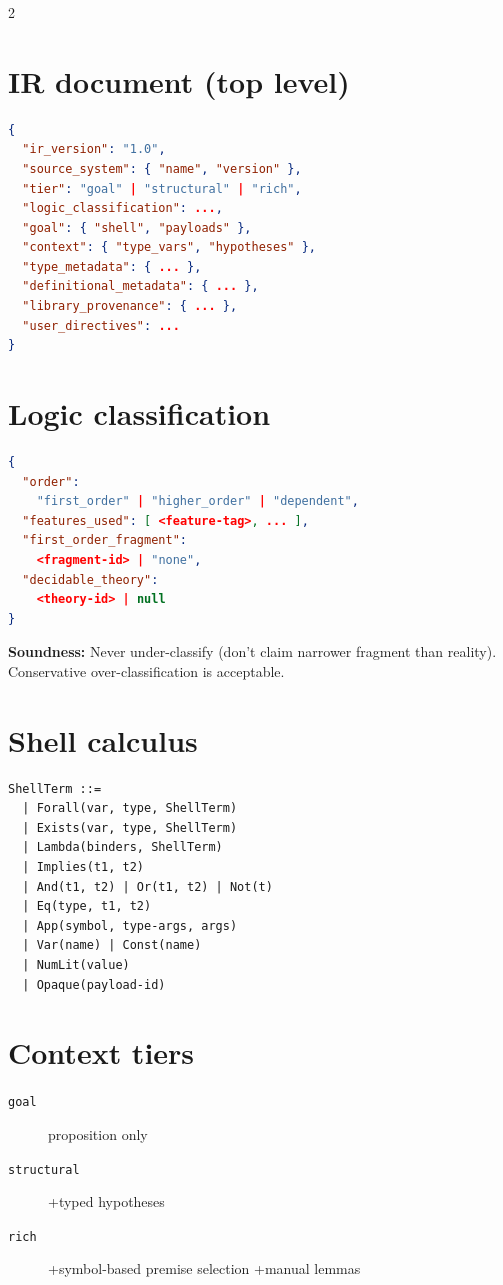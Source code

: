 \documentclass[10pt,letterpaper]{article}
\begin{document}
\begin{multicols}{2}

\section{IR document (top level)}

\begin{lstlisting}[language=json]
{
  "ir_version": "1.0",
  "source_system": { "name", "version" },
  "tier": "goal" | "structural" | "rich",
  "logic_classification": ...,
  "goal": { "shell", "payloads" },
  "context": { "type_vars", "hypotheses" },
  "type_metadata": { ... },
  "definitional_metadata": { ... },
  "library_provenance": { ... },
  "user_directives": ...
}
\end{lstlisting}

\section{Logic classification}

\begin{lstlisting}[language=json]
{
  "order":
    "first_order" | "higher_order" | "dependent",
  "features_used": [ <feature-tag>, ... ],
  "first_order_fragment":
    <fragment-id> | "none",
  "decidable_theory":
    <theory-id> | null
}
\end{lstlisting}

\textbf{Soundness:} Never under-classify (don't claim narrower fragment
than reality). Conservative over-classification is acceptable.

\section{Shell calculus}

\begin{lstlisting}[style=plain]
ShellTerm ::=
  | Forall(var, type, ShellTerm)
  | Exists(var, type, ShellTerm)
  | Lambda(binders, ShellTerm)
  | Implies(t1, t2)
  | And(t1, t2) | Or(t1, t2) | Not(t)
  | Eq(type, t1, t2)
  | App(symbol, type-args, args)
  | Var(name) | Const(name)
  | NumLit(value)
  | Opaque(payload-id)
\end{lstlisting}

\section{Context tiers}

\begin{description}
  \item[\texttt{goal}] proposition only
  \item[\texttt{structural}] +typed hypotheses
  \item[\texttt{rich}] +symbol-based premise selection +manual lemmas
\end{description}


\end{multicols}
\end{document}
